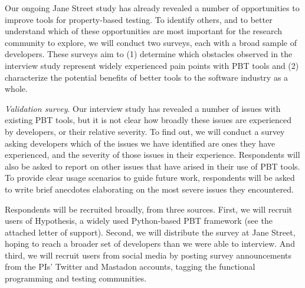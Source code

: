 \iflater{}\fi

\label{sec:survey}

Our ongoing Jane Street study has already revealed a number of
opportunities to improve tools for property-based testing. To identify
others, and to better understand which of these opportunities are most
important for the research community to explore, we will conduct two
surveys, each with a broad sample of developers. These surveys aim to
(1) determine which obstacles observed in the interview study
represent widely experienced pain points with PBT tools and
(2) characterize the potential benefits of better tools to the
software industry as a whole.

\emph{Validation survey}. Our interview study has revealed
a number of issues with existing PBT tools, but it is not clear
how broadly these issues are experienced by developers, or
their relative severity. To find out, we will conduct a survey
asking developers which of the issues we have identified are
ones they have experienced, and the severity of those issues
in their experience. Respondents will also be asked to report on
other issues that have arised in their use of PBT tools.
To provide
clear usage scenarios to guide future work, respondents will
be asked to write brief anecdotes elaborating on the
most severe issues they encountered.

Respondents will
be recruited broadly, from three sources. First, we will recruit
users of Hypothesis, a widely used Python-based PBT
framework
(see the attached letter of support).
Second, we will distribute the survey at Jane Street, hoping to reach
a broader set of developers than we were able to interview.
And third, we will recruit users from social media by posting
survey announcements from the PIs' Twitter and Mastadon
accounts, tagging the functional programming and testing
communities. 

